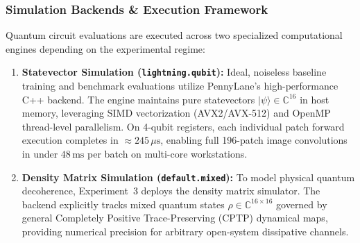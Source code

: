 \documentclass[journal]{IEEEtran}
\begin{document}
\subsubsection{Simulation Backends \& Execution Framework}
Quantum circuit evaluations are executed across two specialized computational engines depending on the experimental regime:
\begin{enumerate}
    \item \textbf{Statevector Simulation (\texttt{lightning.qubit}):} Ideal, noiseless baseline training and benchmark evaluations utilize PennyLane's high-performance C++ backend. The engine maintains pure statevectors $|\psi\rangle \in \mathbb{C}^{16}$ in host memory, leveraging SIMD vectorization (AVX2/AVX-512) and OpenMP thread-level parallelism. On 4-qubit registers, each individual patch forward execution completes in $\approx 245\,\mu\mathrm{s}$, enabling full 196-patch image convolutions in under $48\,\mathrm{ms}$ per batch on multi-core workstations.
    \item \textbf{Density Matrix Simulation (\texttt{default.mixed}):} To model physical quantum decoherence, Experiment~3 deploys the density matrix simulator. The backend explicitly tracks mixed quantum states $\rho \in \mathbb{C}^{16 \times 16}$ governed by general Completely Positive Trace-Preserving (CPTP) dynamical maps, providing numerical precision for arbitrary open-system dissipative channels.
\end{enumerate}
\end{document}
